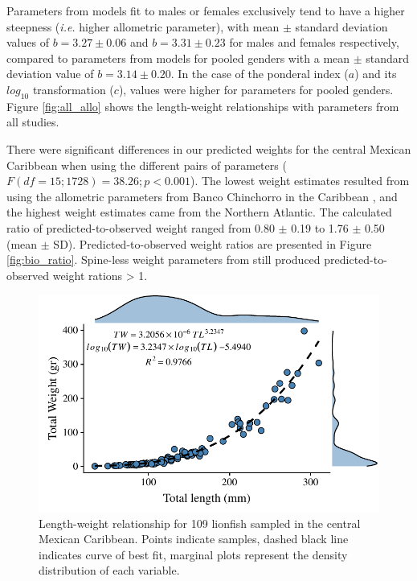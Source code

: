 \documentclass[fleqn,10pt,lineno]{wlpeerj} %
\begin{document}
Parameters from models fit to males or females exclusively tend to have
a higher steepness (\emph{i.e.} higher allometric parameter), with mean
\(\pm\) standard deviation values of \(b = 3.27 \pm 0.06\) and
\(b = 3.31 \pm 0.23\) for males and females respectively, compared to
parameters from models for pooled genders with a mean \(\pm\) standard
deviation value of \(b = 3.14 \pm 0.20\). In the case of the ponderal
index (\(a\)) and its \(log_{10}\) transformation (\(c\)), values were
higher for parameters for pooled genders. Figure \ref{fig:all_allo}
shows the length-weight relationships with parameters from all studies.

There were significant differences in our predicted weights for the
central Mexican Caribbean when using the different pairs of parameters
(\(F(df = 15; 1728) = 38.26; p < 0.001\)). The lowest weight estimates
resulted from using the allometric parameters from Banco Chinchorro in
the Caribbean \citet{sabidoitz_2016}, and the highest weight estimates
came from the Northern Atlantic\citet{barbour_2011}. The calculated
ratio of predicted-to-observed weight ranged from 0.80 \(\pm\) 0.19 to
1.76 \(\pm\) 0.50 (mean \(\pm\) SD). Predicted-to-observed weight ratios
are presented in Figure \ref{fig:bio_ratio}. Spine-less weight
parameters from \citet{fogg_2013} still produced predicted-to-observed
weight rations \textgreater{} 1.

\begin{figure}
\centering
\includegraphics{Manuscript_files/figure-latex/unnamed-chunk-4-1.pdf}
\caption{\label{fig:l-w-carib}Length-weight relationship for 109
lionfish sampled in the central Mexican Caribbean. Points indicate
samples, dashed black line indicates curve of best fit, marginal plots
represent the density distribution of each variable.}
\end{figure}
\end{document}
